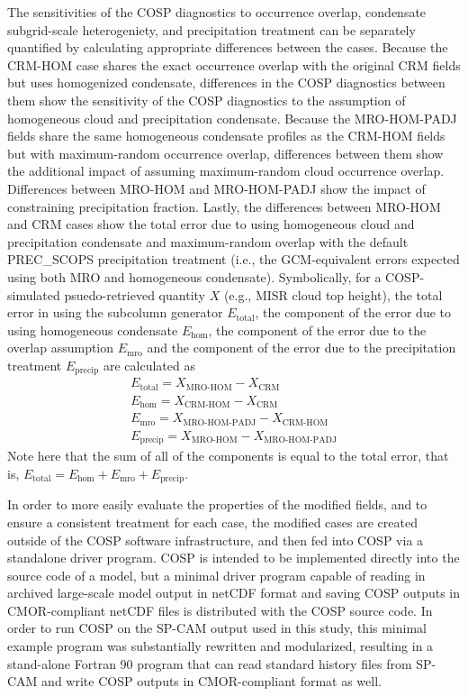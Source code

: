The sensitivities of the COSP diagnostics to occurrence overlap,
condensate subgrid-scale heterogeniety, and precipitation treatment can
be separately quantified by calculating appropriate differences between
the cases. Because the CRM-HOM case shares the exact occurrence overlap
with the original CRM fields but uses homogenized condensate,
differences in the COSP diagnostics between them show the sensitivity of
the COSP diagnostics to the assumption of homogeneous cloud and
precipitation condensate. Because the MRO-HOM-PADJ fields share the same
homogeneous condensate profiles as the CRM-HOM fields but with
maximum-random occurrence overlap, differences between them show the
additional impact of assuming maximum-random cloud occurrence overlap.
Differences between MRO-HOM and MRO-HOM-PADJ show the impact of
constraining precipitation fraction. Lastly, the differences between
MRO-HOM and CRM cases show the total error due to using homogeneous
cloud and precipitation condensate and maximum-random overlap with the
default PREC\_SCOPS precipitation treatment (i.e., the GCM-equivalent
errors expected using both MRO and homogeneous condensate).
Symbolically, for a COSP-simulated psuedo-retrieved quantity \(X\)
(e.g., MISR cloud top height), the total error in using the subcolumn
generator \(E_\textrm{total}\), the component of the error due to using
homogeneous condensate \(E_\textrm{hom}\), the component of the error
due to the overlap assumption \(E_\textrm{mro}\) and the component of
the error due to the precipitation treatment \(E_\textrm{precip}\) are
calculated as \[\begin{gathered} 
    E_\textrm{total} = X_\textrm{MRO-HOM} - X_\textrm{CRM} \\
    E_\textrm{hom} = X_\textrm{CRM-HOM} - X_\textrm{CRM} \\
    E_\textrm{mro} = X_\textrm{MRO-HOM-PADJ} - X_\textrm{CRM-HOM} \\
    E_\textrm{precip} = X_\textrm{MRO-HOM} - X_\textrm{MRO-HOM-PADJ}
\end{gathered}\] Note here that the sum of all of the components is
equal to the total error, that is,
\(E_\textrm{total} = E_\textrm{hom} + E_\textrm{mro} + E_\textrm{precip}\).

In order to more easily evaluate the properties of the modified fields,
and to ensure a consistent treatment for each case, the modified cases
are created outside of the COSP software infrastructure, and then fed
into COSP via a standalone driver program. COSP is intended to be
implemented directly into the source code of a model, but a minimal
driver program capable of reading in archived large-scale model output
in netCDF format and saving COSP outputs in CMOR-compliant netCDF files
is distributed with the COSP source code. In order to run COSP on the
SP-CAM output used in this study, this minimal example program was
substantially rewritten and modularized, resulting in a stand-alone
Fortran 90 program that can read standard history files from SP-CAM and
write COSP outputs in CMOR-compliant format as well.

